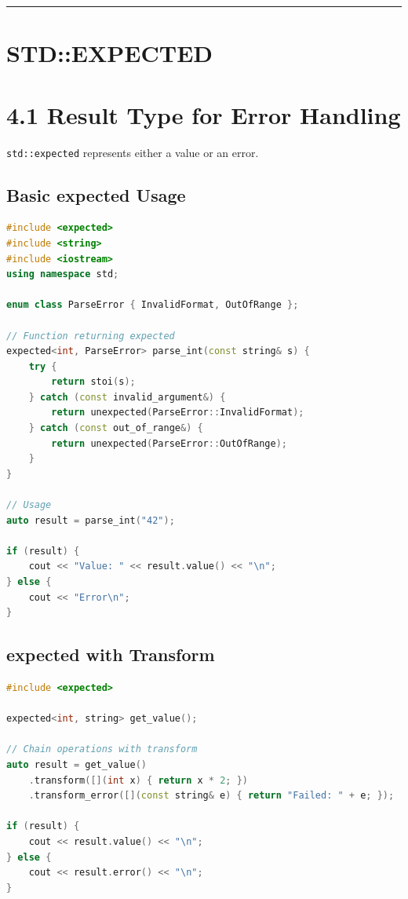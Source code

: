 \begin{center}\rule{0.5\linewidth}{0.5pt}\end{center}

\hypertarget{stdexpected}{%
\section{STD::EXPECTED}\label{stdexpected}}

\hypertarget{result-type-for-error-handling}{%
\section{4.1 Result Type for Error
Handling}\label{result-type-for-error-handling}}

\passthrough{\lstinline!std::expected!} represents either a value or an
error.

\hypertarget{basic-expected-usage}{%
\subsection{Basic expected Usage}\label{basic-expected-usage}}

\begin{lstlisting}[language={C++}]
#include <expected>
#include <string>
#include <iostream>
using namespace std;

enum class ParseError { InvalidFormat, OutOfRange };

// Function returning expected
expected<int, ParseError> parse_int(const string& s) {
    try {
        return stoi(s);
    } catch (const invalid_argument&) {
        return unexpected(ParseError::InvalidFormat);
    } catch (const out_of_range&) {
        return unexpected(ParseError::OutOfRange);
    }
}

// Usage
auto result = parse_int("42");

if (result) {
    cout << "Value: " << result.value() << "\n";
} else {
    cout << "Error\n";
}
\end{lstlisting}

\hypertarget{expected-with-transform}{%
\subsection{expected with Transform}\label{expected-with-transform}}

\begin{lstlisting}[language={C++}]
#include <expected>

expected<int, string> get_value();

// Chain operations with transform
auto result = get_value()
    .transform([](int x) { return x * 2; })
    .transform_error([](const string& e) { return "Failed: " + e; });

if (result) {
    cout << result.value() << "\n";
} else {
    cout << result.error() << "\n";
}
\end{lstlisting}


